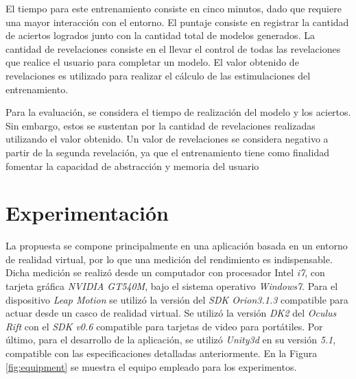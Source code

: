 \documentclass[conference]{IEEEtran}
\begin{document}
El tiempo para este entrenamiento consiste en cinco minutos, dado que requiere una mayor interacción con el entorno. El puntaje consiste en registrar la cantidad de aciertos logrados junto con la cantidad total de modelos generados. La cantidad de revelaciones consiste en el llevar el control de todas las revelaciones que realice el usuario para completar un modelo. El valor obtenido de revelaciones es utilizado para realizar el cálculo de las estimulaciones del entrenamiento.

Para la evaluación, se considera el tiempo de realización del modelo y los aciertos. Sin embargo, estos se sustentan por la cantidad de revelaciones realizadas utilizando el valor obtenido. Un valor de revelaciones se considera negativo a partir de la segunda revelación, ya que el entrenamiento tiene como finalidad fomentar la capacidad de abstracción y memoria del usuario


\section{Experimentación} \label{tests}

La propuesta se compone principalmente en una aplicación basada en un entorno de realidad virtual, por lo que una medición del rendimiento es indispensable. Dicha medición se realizó desde un computador con procesador Intel \textit{i7}, con tarjeta gráfica \textit{NVIDIA GT540M}, bajo el sistema operativo \textit{Windows7}. Para el dispositivo \textit{Leap Motion} se utilizó la versión del \textit{SDK Orion3.1.3} compatible para actuar desde un casco de realidad virtual. Se utilizó la versión \textit{DK2} del \textit{Oculus Rift} con el \textit{SDK v0.6} compatible para tarjetas de video para portátiles. Por último, para el desarrollo de la aplicación, se utilizó \textit{Unity3d} en su versión \textit{5.1}, compatible con las especificaciones detalladas anteriormente. En la Figura \ref{fig:equipment} se muestra el equipo empleado para los experimentos.
\end{document}
